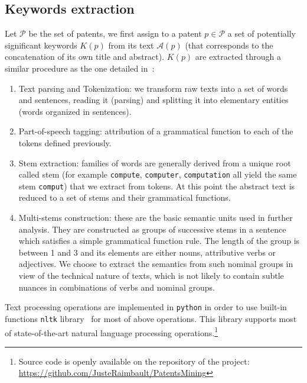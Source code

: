 \documentclass[12pt,twoside,a4paper]{article}
\begin{document}
\subsection{Keywords extraction}
\label{keywordsextraction}

Let $\mathcal{P}$ be the set of patents, we first assign to a patent $p\in \mathcal{P}$ a set of potentially significant keywords $K(p)$ from its text ${\mathcal{A}}(p)$ (that corresponds to the concatenation of its own title and abstract).
$K(p)$ are extracted through a similar procedure as the one detailed in~\cite{chavalarias2013phylomemetic}: 
\begin{enumerate}
\item Text parsing and Tokenization: we transform raw texts into a set of words and sentences, reading it (parsing) and splitting it into elementary entities (words organized in sentences).

\item Part-of-speech tagging: attribution of a grammatical function to each of the tokens defined previously.

\item Stem extraction: families of words are generally derived from a unique root called stem (for example \texttt{compute}, \texttt{computer}, \texttt{computation} all yield the same stem \texttt{comput}) that we extract from tokens. At this point the abstract text is reduced to a set of stems and their grammatical functions.
\item Multi-stems construction: these are the basic semantic units used in further analysis. They are constructed as groups of successive stems in a sentence which satisfies a simple grammatical function rule. The length of the group is between 1 and 3 and its elements are either nouns, attributive verbs or adjectives. We choose to extract the semantics from such nominal groups in view of the technical nature of texts, which is not likely to contain subtle nuances in combinations of verbs and nominal groups.
\end{enumerate}

Text processing operations are implemented in \texttt{python} in order to use built-in functions \texttt{nltk} library~\cite{nltk} for most of above operations. This library supports most of state-of-the-art natural language processing operations.\footnote{Source code is openly available on the repository of the project: \url{https://github.com/JusteRaimbault/PatentsMining} 
}

\end{document}
